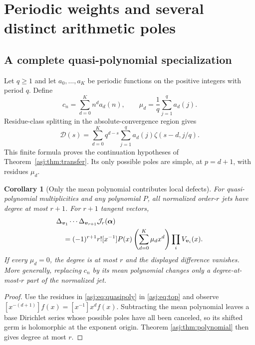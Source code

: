 \documentclass[11pt]{article}
\numberwithin{equation}{section}
\newtheorem{corollary}[theorem]{Corollary}
\theoremstyle{definition}\newtheorem{definition}[theorem]{Definition}
\theoremstyle{remark}\newtheorem{remark}[theorem]{Remark}\newtheorem{example}[theorem]{Example}
\newcommand{\D}{\mathscr D}\newcommand{\calH}{\mathcal H}\newcommand{\calR}{\mathcal R}
\newcommand{\calJ}{\mathcal J}\newcommand{\calZ}{\mathcal Z}
\begin{document}


\section{Periodic weights and several distinct arithmetic poles}
\label{asj:sec:arithmetic}

\subsection{A complete quasi-polynomial specialization}
Let $q\ge1$ and let $a_0,\ldots,a_K$ be periodic functions on the positive
integers with period $q$. Define
\[
 c_n=\sum_{d=0}^K n^d a_d(n),\qquad
 \mu_d=\frac1q\sum_{j=1}^q a_d(j).
\]
Residue-class splitting in the absolute-convergence region gives
\begin{equation}\label{asj:eq:quasipoly}
 \D(s)=\sum_{d=0}^K q^{d-s}
                  \sum_{j=1}^q a_d(j)\zeta(s-d,j/q).
\end{equation}
This finite formula proves the continuation hypotheses of
Theorem~\ref{asj:thm:transfer}. Its only possible poles are simple, at $p=d+1$,
with residues $\mu_d$.

\begin{corollary}[Only the mean polynomial contributes local defects]
\label{asj:thm:mean}
For quasi-polynomial multiplicities and any polynomial $P$, all normalized
order-$r$ jets have degree at most $r+1$. For $r+1$ tangent vectors,
\begin{align}\label{asj:eq:mean}
 &\Delta_{\boldsymbol v_1}\cdots\Delta_{\boldsymbol v_{r+1}}
       \calJ_r(\boldsymbol\alpha)\notag\\
 &\quad=(-1)^{r+1}r![x^{-1}]P(x)
           \left(\sum_{d=0}^K\mu_dx^d\right)
                       \prod_i V_{\boldsymbol v_i}(x).
\end{align}
If every $\mu_d=0$, the degree is at most $r$ and the displayed difference
vanishes. More generally, replacing $c_n$ by its mean polynomial changes
only a degree-at-most-$r$ part of the normalized jet.
\end{corollary}
\begin{proof}
Use the residues in \eqref{asj:eq:quasipoly} in \eqref{asj:eq:top} and observe
$[x^{-(d+1)}]f(x)=[x^{-1}]x^d f(x)$. Subtracting the mean polynomial
leaves a base Dirichlet series whose possible poles have all been canceled,
so its shifted germ is holomorphic at the exponent origin. Theorem
\ref{asj:thm:polynomial} then gives degree at most $r$.
\end{proof}
\end{document}
